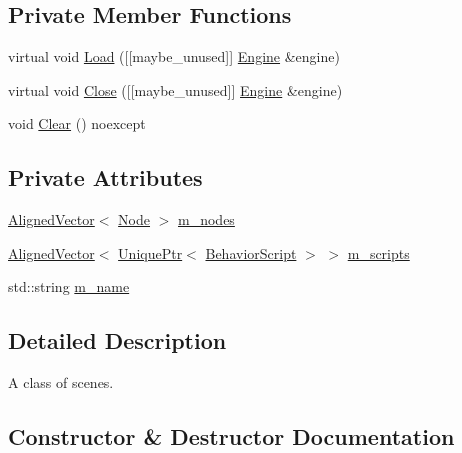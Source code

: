 \subsection*{Private Member Functions}
\begin{DoxyCompactItemize}
\item 
virtual void \mbox{\hyperlink{classmage_1_1_scene_a02ec2f7b43fd7050bc41eb7d89d4baba}{Load}} (\mbox{[}\mbox{[}maybe\+\_\+unused\mbox{]}\mbox{]} \mbox{\hyperlink{classmage_1_1_engine}{Engine}} \&engine)
\item 
virtual void \mbox{\hyperlink{classmage_1_1_scene_a6b90bb51fb3b5e965a42bfa57f992803}{Close}} (\mbox{[}\mbox{[}maybe\+\_\+unused\mbox{]}\mbox{]} \mbox{\hyperlink{classmage_1_1_engine}{Engine}} \&engine)
\item 
void \mbox{\hyperlink{classmage_1_1_scene_adf4a5b3885e34336caa5f145f55e01e1}{Clear}} () noexcept
\end{DoxyCompactItemize}
\subsection*{Private Attributes}
\begin{DoxyCompactItemize}
\item 
\mbox{\hyperlink{namespacemage_a8664bfb5ce2179fc64eae9f82c8a5ba8}{Aligned\+Vector}}$<$ \mbox{\hyperlink{classmage_1_1_node}{Node}} $>$ \mbox{\hyperlink{classmage_1_1_scene_a270ac4a26210b95ba05957af19c4c43c}{m\+\_\+nodes}}
\item 
\mbox{\hyperlink{namespacemage_a8664bfb5ce2179fc64eae9f82c8a5ba8}{Aligned\+Vector}}$<$ \mbox{\hyperlink{namespacemage_a3316d7143a973e37adf1110f2e80ca31}{Unique\+Ptr}}$<$ \mbox{\hyperlink{classmage_1_1_behavior_script}{Behavior\+Script}} $>$ $>$ \mbox{\hyperlink{classmage_1_1_scene_ae57ca3aeb6b0d8b2cb8cf40334b883f8}{m\+\_\+scripts}}
\item 
std\+::string \mbox{\hyperlink{classmage_1_1_scene_aebd60452eca5423c3bde3fca653f3533}{m\+\_\+name}}
\end{DoxyCompactItemize}


\subsection{Detailed Description}
A class of scenes. 

\subsection{Constructor \& Destructor Documentation}
\mbox{\label{classmage_1_1_scene_adc40910fdca62586659c2961fe7e7f3c}} 
